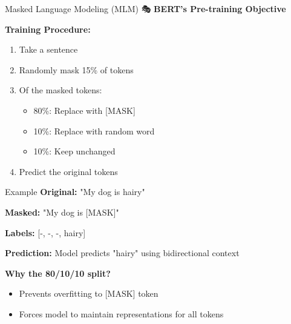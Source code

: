 \documentclass[aspectratio=169]{beamer}
\begin{document}
\begin{frame}[shrink=10]{Masked Language Modeling (MLM) 🎭}
\textbf{BERT's Pre-training Objective}

\vspace{1em}

\textbf{Training Procedure:}
\begin{enumerate}\setlength{\itemsep}{0pt}
    \item Take a sentence
    \item Randomly mask 15\% of tokens
    \item Of the masked tokens:
    \begin{itemize}\setlength{\itemsep}{0pt}
        \item 80\%: Replace with [MASK]
        \item 10\%: Replace with random word
        \item 10\%: Keep unchanged
    \end{itemize}
    \item Predict the original tokens
\end{enumerate}

\vspace{1em}

\begin{exampleblock}{Example}
\textbf{Original:} "My dog is hairy"

\textbf{Masked:} "My dog is [MASK]"

\textbf{Labels:} [-, -, -, hairy]

\textbf{Prediction:} Model predicts "hairy" using bidirectional context
\end{exampleblock}

\vspace{1em}

\textbf{Why the 80/10/10 split?}
\begin{itemize}\setlength{\itemsep}{0pt}
    \item Prevents overfitting to [MASK] token
    \item Forces model to maintain representations for all tokens
\end{itemize}
\end{frame}
\end{document}
